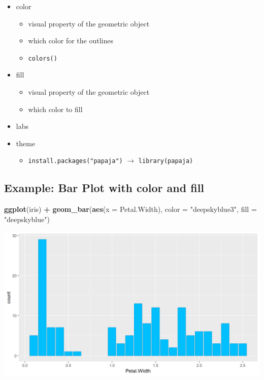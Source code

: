 \documentclass[
]{book}
\newenvironment{Shaded}{\begin{snugshade}}{\end{snugshade}}
\newcommand{\AttributeTok}[1]{\textcolor[rgb]{0.13,0.29,0.53}{#1}}
\newcommand{\FunctionTok}[1]{\textcolor[rgb]{0.13,0.29,0.53}{\textbf{#1}}}
\newcommand{\NormalTok}[1]{#1}
\newcommand{\SpecialCharTok}[1]{\textcolor[rgb]{0.81,0.36,0.00}{\textbf{#1}}}
\newcommand{\StringTok}[1]{\textcolor[rgb]{0.31,0.60,0.02}{#1}}
\providecommand{\tightlist}{%
  \setlength{\itemsep}{0pt}\setlength{\parskip}{0pt}}
\begin{document}
\begin{itemize}
\tightlist
\item
  color

  \begin{itemize}
  \tightlist
  \item
    visual property of the geometric object
  \item
    which color for the outlines
  \item
    \texttt{colors()}
  \end{itemize}
\item
  fill

  \begin{itemize}
  \tightlist
  \item
    visual property of the geometric object
  \item
    which color to fill
  \end{itemize}
\item
  labs
\item
  theme

  \begin{itemize}
  \tightlist
  \item
    \texttt{install.packages("papaja")} \(\rightarrow\) \texttt{library(papaja)}
  \end{itemize}
\end{itemize}

\subsection{Example: Bar Plot with color and fill}\label{example-bar-plot-with-color-and-fill}

\begin{Shaded}
\begin{Highlighting}[]
\FunctionTok{ggplot}\NormalTok{(iris) }\SpecialCharTok{+} 
  \FunctionTok{geom\_bar}\NormalTok{(}\FunctionTok{aes}\NormalTok{(}\AttributeTok{x =}\NormalTok{ Petal.Width), }\AttributeTok{color =} \StringTok{"deepskyblue3"}\NormalTok{, }\AttributeTok{fill =} \StringTok{"deepskyblue"}\NormalTok{)}
\end{Highlighting}
\end{Shaded}

\begin{flushleft}\includegraphics{_main_files/figure-html/bpcf-1} \end{flushleft}
\end{document}
